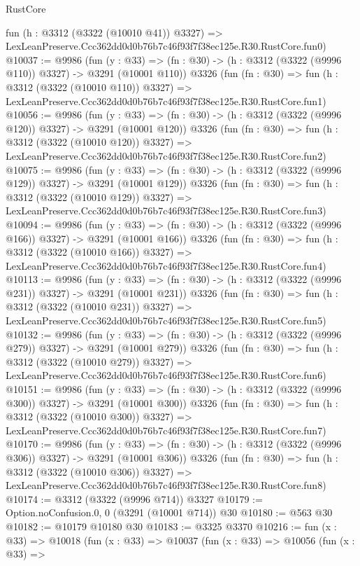 \begin{lexlean}{RustCore}
\begin{coremodule}
    fun (h : @3312 (@3322 (@10010 @41)) @3327) =>
    LexLeanPreserve.Ccc362dd0d0b76b7c46f93f7f38ec125e.R30.RustCore.fun0)
@10037 := @9986
    (fun (y : @33) => (fn : @30) -> (h : @3312 (@3322 (@9996 @110)) @3327) -> @3291 (@10001 @110))
    @3326
    (fun (fn : @30) =>
    fun (h : @3312 (@3322 (@10010 @110)) @3327) =>
    LexLeanPreserve.Ccc362dd0d0b76b7c46f93f7f38ec125e.R30.RustCore.fun1)
@10056 := @9986
    (fun (y : @33) => (fn : @30) -> (h : @3312 (@3322 (@9996 @120)) @3327) -> @3291 (@10001 @120))
    @3326
    (fun (fn : @30) =>
    fun (h : @3312 (@3322 (@10010 @120)) @3327) =>
    LexLeanPreserve.Ccc362dd0d0b76b7c46f93f7f38ec125e.R30.RustCore.fun2)
@10075 := @9986
    (fun (y : @33) => (fn : @30) -> (h : @3312 (@3322 (@9996 @129)) @3327) -> @3291 (@10001 @129))
    @3326
    (fun (fn : @30) =>
    fun (h : @3312 (@3322 (@10010 @129)) @3327) =>
    LexLeanPreserve.Ccc362dd0d0b76b7c46f93f7f38ec125e.R30.RustCore.fun3)
@10094 := @9986
    (fun (y : @33) => (fn : @30) -> (h : @3312 (@3322 (@9996 @166)) @3327) -> @3291 (@10001 @166))
    @3326
    (fun (fn : @30) =>
    fun (h : @3312 (@3322 (@10010 @166)) @3327) =>
    LexLeanPreserve.Ccc362dd0d0b76b7c46f93f7f38ec125e.R30.RustCore.fun4)
@10113 := @9986
    (fun (y : @33) => (fn : @30) -> (h : @3312 (@3322 (@9996 @231)) @3327) -> @3291 (@10001 @231))
    @3326
    (fun (fn : @30) =>
    fun (h : @3312 (@3322 (@10010 @231)) @3327) =>
    LexLeanPreserve.Ccc362dd0d0b76b7c46f93f7f38ec125e.R30.RustCore.fun5)
@10132 := @9986
    (fun (y : @33) => (fn : @30) -> (h : @3312 (@3322 (@9996 @279)) @3327) -> @3291 (@10001 @279))
    @3326
    (fun (fn : @30) =>
    fun (h : @3312 (@3322 (@10010 @279)) @3327) =>
    LexLeanPreserve.Ccc362dd0d0b76b7c46f93f7f38ec125e.R30.RustCore.fun6)
@10151 := @9986
    (fun (y : @33) => (fn : @30) -> (h : @3312 (@3322 (@9996 @300)) @3327) -> @3291 (@10001 @300))
    @3326
    (fun (fn : @30) =>
    fun (h : @3312 (@3322 (@10010 @300)) @3327) =>
    LexLeanPreserve.Ccc362dd0d0b76b7c46f93f7f38ec125e.R30.RustCore.fun7)
@10170 := @9986
    (fun (y : @33) => (fn : @30) -> (h : @3312 (@3322 (@9996 @306)) @3327) -> @3291 (@10001 @306))
    @3326
    (fun (fn : @30) =>
    fun (h : @3312 (@3322 (@10010 @306)) @3327) =>
    LexLeanPreserve.Ccc362dd0d0b76b7c46f93f7f38ec125e.R30.RustCore.fun8)
@10174 := @3312 (@3322 (@9996 @714)) @3327
@10179 := Option.noConfusion.{0, 0} (@3291 (@10001 @714)) @30
@10180 := @563 @30
@10182 := @10179 @10180 @30
@10183 := @3325 @3370
@10216 := fun (x : @33) =>
  @10018
    (fun (x : @33) =>
    @10037
      (fun (x : @33) =>
      @10056
        (fun (x : @33) =>

\end{coremodule}
\end{lexlean}
